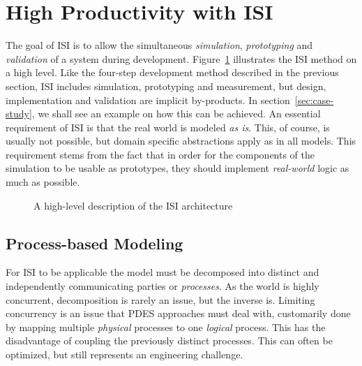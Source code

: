 \section{High Productivity with ISI}
The goal of ISI is to allow the simultaneous \emph{simulation},
\emph{prototyping} and \emph{validation} of a system during development.
Figure~\ref{easy} illustrates the ISI method on a high level. Like the
four-step development method described in the previous section, ISI includes
simulation, prototyping and measurement, but design, implementation and
validation are implicit by-products. In section~\ref{sec:case-study}, we shall see an example on
how this can be achieved. An essential requirement of ISI is that the real world
is modeled \emph{as is}. This, of course, is usually not possible, but domain
specific abstractions apply as in all models. This requirement stems from the
fact that in order for the components of the simulation to be usable as
prototypes, they should implement \emph{real-world} logic as much as possible.

\begin{figure}[htb]
\caption{A high-level description of the ISI architecture}
\label{easy}
\end{figure}

\subsection{Process-based Modeling}
For ISI to be applicable the model must be decomposed into distinct and
independently communicating parties or \emph{processes}. As the world is highly
concurrent, decomposition is rarely an issue, but the inverse is. Limiting
concurrency is an issue that PDES approaches must deal with, customarily done
by mapping multiple \emph{physical} processes to one \emph{logical} process.
This has the disadvantage of coupling the previously distinct processes. This can
often be optimized, but still represents an engineering challenge.

